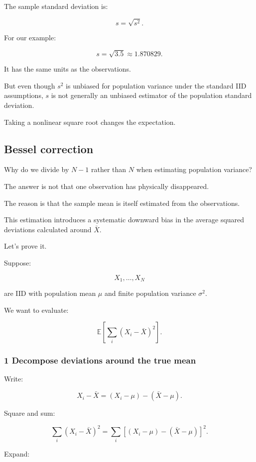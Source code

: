 The sample standard deviation is:

\[
 \boxed{s=\sqrt{s^2}}.
\]

For our example:

\[
 s=\sqrt{3.5}\approx1.870829.
\]

It has the same units as the observations.

But even though \(s^2\) is unbiased for population variance under the standard IID assumptions, \(s\) is not generally an unbiased estimator of the population standard deviation.

Taking a nonlinear square root changes the expectation.

\subsection{Bessel correction}\label{02-foundations-ii-ch030-bessel-correction}

Why do we divide by \(N-1\) rather than \(N\) when estimating population variance?

The answer is not that one observation has physically disappeared.

The reason is that the sample mean is itself estimated from the observations.

This estimation introduces a systematic downward bias in the average squared deviations calculated around \(\bar X\).

Let's prove it.

Suppose:

\[
 X_1,\ldots,X_N
\]

are IID with population mean \(\mu\) and finite population variance \(\sigma^2\).

We want to evaluate:

\[
 \mathbb E\left[ \sum_i(X_i-\bar X)^2 \right].
\]

\subsubsection{1 Decompose deviations around the true mean}\label{02-foundations-ii-ch030-decompose-deviations-around-the-true-mean}

Write:

\[
 X_i-\bar X = (X_i-\mu)-(\bar X-\mu).
\]

Square and sum:

\[
 \sum_i(X_i-\bar X)^2 = \sum_i[ (X_i-\mu)-(\bar X-\mu) ]^2.
\]

Expand:

